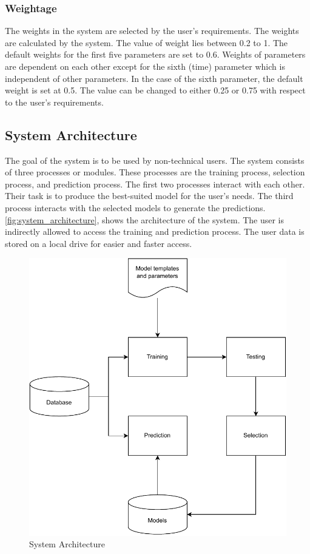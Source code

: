 \documentclass[a4paper,fleqn]{cas-dc}
\begin{document}
\subsubsection{Weightage}\label{subsubsec:weightage}

The weights in the system are selected by the user's requirements. The weights are calculated by the system. The value of weight lies between 0.2 to 1. The default weights for the first five parameters are set to 0.6. Weights of parameters are dependent on each other except for the sixth (time) parameter which is independent of other parameters. In the case of the sixth parameter, the default weight is set at 0.5. The value can be changed to either 0.25 or 0.75 with respect to the user's requirements.

\subsection{System Architecture}\label{subsec:system_architecture}

The goal of the system is to be used by non-technical users. The system consists of three processes or modules. These processes are the training process, selection process, and prediction process. The first two processes interact with each other. Their task is to produce the best-suited model for the user's needs. The third process interacts with the selected models to generate the predictions. \autoref{fig:system_architecture}, shows the architecture of the system. The user is indirectly allowed to access the training and prediction process. The user data is stored on a local drive for easier and faster access.

\begin{figure}[ht]
    \centering
    \includegraphics[width=0.9\columnwidth]{system_architecture.pdf}
    \caption{System Architecture}
    \label{fig:system_architecture}
\end{figure}
\end{document}
